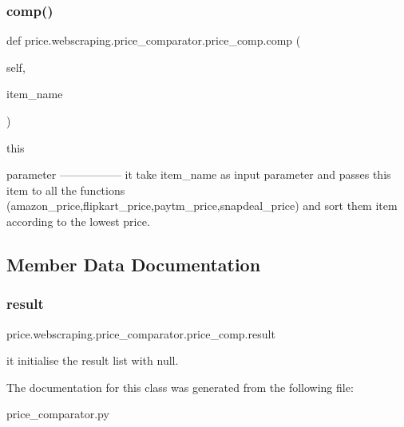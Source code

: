\subsubsection{\texorpdfstring{comp()}{comp()}}
{\footnotesize\ttfamily def price.\+webscraping.\+price\+\_\+comparator.\+price\+\_\+comp.\+comp (\begin{DoxyParamCaption}\item[{}]{self,  }\item[{}]{item\+\_\+name }\end{DoxyParamCaption})}

\begin{DoxyVerb}this

parameter
-----------------
it take item_name as input parameter and passes this item to all the functions (amazon_price,flipkart_price,paytm_price,snapdeal_price)
and sort them item according to the lowest price.
\end{DoxyVerb}
 

\subsection{Member Data Documentation}
\mbox{\label{classprice_1_1webscraping_1_1price__comparator_1_1price__comp_a0df412f91db90a50a11c6e2f80adc7d5}} 
\subsubsection{\texorpdfstring{result}{result}}
{\footnotesize\ttfamily price.\+webscraping.\+price\+\_\+comparator.\+price\+\_\+comp.\+result\hspace{0.3cm}{\ttfamily [static]}}

\begin{DoxyVerb}it initialise the result list with null.
\end{DoxyVerb}
 

The documentation for this class was generated from the following file\+:\begin{DoxyCompactItemize}
\item 
price\+\_\+comparator.\+py\end{DoxyCompactItemize}
